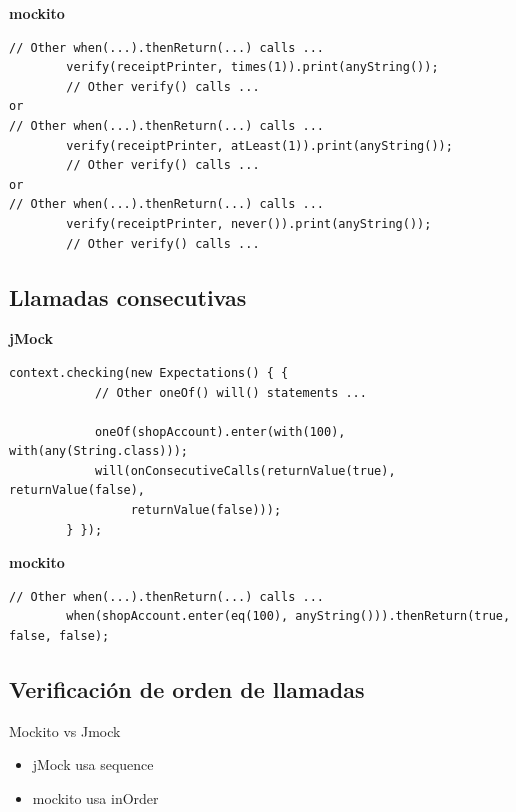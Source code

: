 \documentclass[]{beamer}
\begin{document}
\begin{frame}[fragile]
\textbf{mockito}
\begin{verbatim}
// Other when(...).thenReturn(...) calls ...
        verify(receiptPrinter, times(1)).print(anyString());
        // Other verify() calls ...
or
// Other when(...).thenReturn(...) calls ...
        verify(receiptPrinter, atLeast(1)).print(anyString());
        // Other verify() calls ...
or
// Other when(...).thenReturn(...) calls ...
        verify(receiptPrinter, never()).print(anyString());
        // Other verify() calls ...
\end{verbatim}
\end{frame}

\subsection{Llamadas consecutivas}
\begin{frame}[fragile]
\textbf{jMock}
\begin{verbatim}
context.checking(new Expectations() { {
            // Other oneOf() will() statements ...

            oneOf(shopAccount).enter(with(100), with(any(String.class)));
            will(onConsecutiveCalls(returnValue(true), returnValue(false),
                 returnValue(false)));
        } });
\end{verbatim}
\textbf{mockito}
\begin{verbatim}
// Other when(...).thenReturn(...) calls ...
        when(shopAccount.enter(eq(100), anyString())).thenReturn(true, false, false);
\end{verbatim}
\end{frame}

\subsection{Verificación de orden de llamadas}
\begin{frame}{Mockito vs Jmock}
  \begin{itemize}
  \item jMock usa sequence
  \item mockito usa inOrder
  \end{itemize}
\end{frame}
\end{document}
